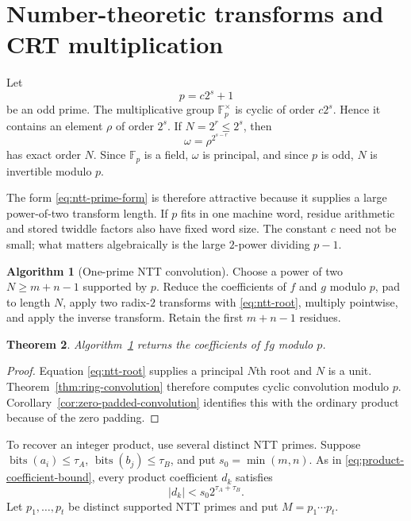 \documentclass[11pt]{book}
\newtheorem{theorem}{Theorem}[section]
\theoremstyle{definition}
\newtheorem{algorithm}[theorem]{Algorithm}
\newcommand{\bits}{\operatorname{bits}}
\begin{document}
\section{Number-theoretic transforms and CRT multiplication}

Let
\begin{equation}\label{eq:ntt-prime-form}
 p=c2^s+1
\end{equation}
be an odd prime.  The multiplicative group $\mathbb F_p^\times$ is cyclic of
order $c2^s$.  Hence it contains an element $\rho$ of order $2^s$.  If
$N=2^r\leq2^s$, then
\begin{equation}\label{eq:ntt-root}
 \omega=\rho^{2^{s-r}}
\end{equation}
has exact order $N$.  Since $\mathbb F_p$ is a field, $\omega$ is principal,
and since $p$ is odd, $N$ is invertible modulo $p$.

The form \eqref{eq:ntt-prime-form} is therefore attractive because it supplies
a large power-of-two transform length.  If $p$ fits in one machine word,
residue arithmetic and stored twiddle factors also have fixed word size.  The
constant $c$ need not be small; what matters algebraically is the large
$2$-power dividing $p-1$.

\begin{algorithm}[One-prime NTT convolution]\label{alg:one-prime-ntt}
Choose a power of two $N\geq m+n-1$ supported by $p$.
Reduce the coefficients of $f$ and $g$ modulo $p$, pad to length $N$, apply
two radix-$2$ transforms with \eqref{eq:ntt-root}, multiply pointwise, and
apply the inverse transform.  Retain the first $m+n-1$ residues.
\end{algorithm}

\begin{theorem}\label{thm:one-prime-ntt-correct}
Algorithm~\ref{alg:one-prime-ntt} returns the coefficients of $fg$ modulo
$p$.
\end{theorem}

\begin{proof}
Equation \eqref{eq:ntt-root} supplies a principal $N$th root and $N$ is a unit.
Theorem~\ref{thm:ring-convolution} therefore computes cyclic convolution
modulo $p$.  Corollary~\ref{cor:zero-padded-convolution} identifies this with
the ordinary product because of the zero padding.
\end{proof}

To recover an integer product, use several distinct NTT primes.  Suppose
$\bits(a_i)\leq\tau_A$, $\bits(b_j)\leq\tau_B$, and put
$s_0=\min(m,n)$.  As in \eqref{eq:product-coefficient-bound}, every product
coefficient $d_k$ satisfies
\begin{equation}\label{eq:ntt-coefficient-bound}
 |d_k|<s_0 2^{\tau_A+\tau_B}.
\end{equation}
Let $p_1,\ldots,p_t$ be distinct supported NTT primes and put
$M=p_1\cdots p_t$.
\end{document}
